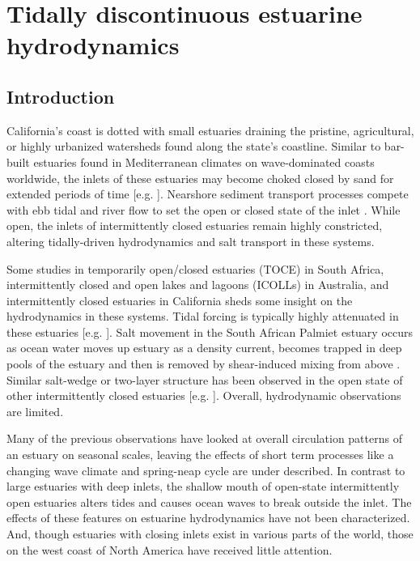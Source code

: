 \chapter{Tidally discontinuous estuarine hydrodynamics}
\label{ch3}




\section{Introduction}

California's coast is dotted with small estuaries draining the pristine,
agricultural, or highly urbanized watersheds found along the state's
coastline. Similar to bar-built estuaries found in Mediterranean climates
on wave-dominated coasts worldwide, the inlets of these estuaries
may become choked closed by sand for extended periods of time {[}e.g.
\cite{elwany_opening_1998,hanes_waves_2011,fortunato_morphological_2014,ranasinghe_seasonal_2003}{]}.
Nearshore sediment transport processes compete with ebb tidal and
river flow to set the open or closed state of the inlet \cite{behrens_episodic_2013}.
While open, the inlets of intermittently closed estuaries remain highly
constricted, altering tidally-driven hydrodynamics and salt transport
in these systems.

Some studies in temporarily open/closed estuaries (TOCE) in South
Africa, intermittently closed and open lakes and lagoons (ICOLLs)
in Australia, and intermittently closed estuaries in California sheds
some insight on the hydrodynamics in these systems. Tidal forcing
is typically highly attenuated in these estuaries {[}e.g. \citealp{ranasinghe_circulation_1999,gale_processes_2007}{]}.
Salt movement in the South African Palmiet estuary occurs as ocean
water moves up estuary as a density current, becomes trapped in deep
pools of the estuary and then is removed by shear-induced mixing from
above \citep{largier_dynamics_1991}. Similar salt-wedge or two-layer
structure has been observed in the open state of other intermittently
closed estuaries {[}e.g. \citealp{sharples_quantifying_2003}{]}. Overall,
hydrodynamic observations are limited.

Many of the previous observations have looked at overall circulation
patterns of an estuary on seasonal scales, leaving the effects of
short term processes like a changing wave climate and spring-neap
cycle are under described. In contrast to large estuaries with deep
inlets, the shallow mouth of open-state intermittently open estuaries
alters tides and causes ocean waves to break outside the inlet. The
effects of these features on estuarine hydrodynamics have not been
characterized. And, though estuaries with closing inlets exist in
various parts of the world, those on the west coast of North America
have received little attention. 

